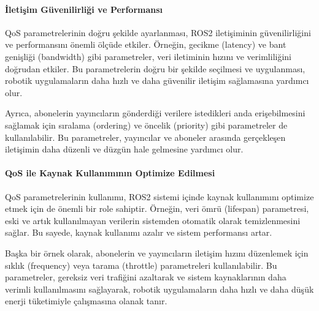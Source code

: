 \paragraph{İletişim Güvenilirliği ve Performansı}
QoS parametrelerinin doğru şekilde ayarlanması, ROS2 iletişiminin güvenilirliğini ve performansını önemli ölçüde etkiler. Örneğin, gecikme (latency) ve bant genişliği (bandwidth) gibi parametreler, veri iletiminin hızını ve verimliliğini doğrudan etkiler. Bu parametrelerin doğru bir şekilde seçilmesi ve uygulanması, robotik uygulamaların daha hızlı ve daha güvenilir iletişim sağlamasına yardımcı olur.

Ayrıca, abonelerin yayıncıların gönderdiği verilere istedikleri anda erişebilmesini sağlamak için sıralama (ordering) ve öncelik (priority) gibi parametreler de kullanılabilir. Bu parametreler, yayıncılar ve aboneler arasında gerçekleşen iletişimin daha düzenli ve düzgün hale gelmesine yardımcı olur.

\paragraph{QoS ile Kaynak Kullanımının Optimize Edilmesi}
QoS parametrelerinin kullanımı, ROS2 sistemi içinde kaynak kullanımını optimize etmek için de önemli bir role sahiptir. Örneğin, veri ömrü (lifespan) parametresi, eski ve artık kullanılmayan verilerin sistemden otomatik olarak temizlenmesini sağlar. Bu sayede, kaynak kullanımı azalır ve sistem performansı artar.

Başka bir örnek olarak, abonelerin ve yayıncıların iletişim hızını düzenlemek için sıklık (frequency) veya tarama (throttle) parametreleri kullanılabilir. Bu parametreler, gereksiz veri trafiğini azaltarak ve sistem kaynaklarının daha verimli kullanılmasını sağlayarak, robotik uygulamaların daha hızlı ve daha düşük enerji tüketimiyle çalışmasına olanak tanır.